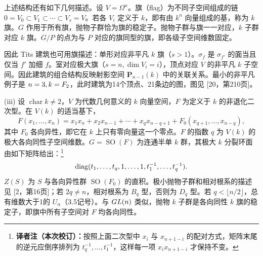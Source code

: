 上述结构还有如下几何描述。设 $V=\Omega^n$。旗（flag）为不同子空间组成的链 $0=V_0\subset V_1\subset\cdots\subset V_s=V$。若各 $V_i$ 定义于 $k$，即有由 $k^n$ 向量组成的基，称为 $k$ 旗。$G$ 作用于所有旗，抛物子群恰为旗的稳定子。抛物子群与旗一一对应，$k$ 子群对应 $k$ 旗。$G/P$ 的点为与 $P$ 对应的旗同型的旗，即各级子空间维数固定。

因此 Tits 建筑也可用旗描述：单形对应非平凡 $k$ 旗（$s>1$）。$\sigma_f$ 是 $\sigma_{f'}$ 的面当且仅当 $f'$ 加细 $f$。室对应极大旗（$s=n,\dim V_i=i$），顶点对应 $V$ 的非平凡 $k$ 子空间。因此建筑的组合结构反映射影空间 $\mathbf P_{n-1}(k)$ 中的关联关系。最小的非平凡例子是 $n=3,k=F_2$，此时建筑为14个顶点、21条边的图，图见 [20，第210页]。

(iii) 设 $\operatorname{char}k\ne2$，$V$ 为代数几何意义的 $k$ 向量空间，$F$ 为定义于 $k$ 的非退化二次型。在 $V(k)$ 的适当基下，
\[
 F(x_1,\ldots,x_n)=x_1x_n+x_2x_{n-1}+\cdots+x_qx_{n-q+1}
 +F_0(x_{q+1},\ldots,x_{n-q}),
\]
其中 $F_0$ 各向异性，即它在 $k$ 上只有零向量这一个零点。$F$ 的指数 $q$ 为 $V(k)$ 的极大各向同性子空间维数。$G=\operatorname{SO}(F)$ 为连通半单 $k$ 群，其极大 $k$ 分裂环面由如下矩阵给出：\nobreak\footnote{\textbf{译者注（本次校订）：}按照上面二次型中 $x_i$ 与 $x_{n+1-i}$ 的配对方式，矩阵末尾的逆元应倒序排列为 $t_q^{-1},\ldots,t_1^{-1}$，这样每一项 $x_i x_{n+1-i}$ 才保持不变。}
\[
 \operatorname{diag}(t_1,\ldots,t_q,1,\ldots,1,t_1^{-1},\ldots,t_q^{-1}).
\]
$Z(S)$ 为 $S$ 与各向异性群 $\operatorname{SO}(F_0)$ 的直积。极小抛物子群和相对根系的描述见 [2，第16页]；若 $2q\ne n$，相对根系为 $B_q$ 型，否则为 $D_q$ 型。若 $q<\lfloor n/2\rfloor$，总有维数大于1的 $U_\alpha$（3.5记号）。与 $GL(n)$ 类似，抛物 $k$ 子群是各向同性 $k$ 旗的稳定子，即旗中所有子空间对 $F$ 均各向同性。

